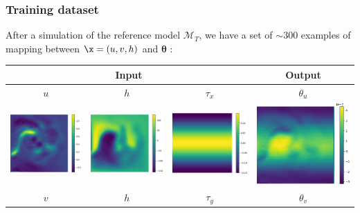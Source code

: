 \documentclass[handout]{beamer}
\newcommand{\btheta}{\mathbf{\theta}}
\newcommand{\M}{\mathcal{M}}
\begin{document}
\begin{frame}
\frametitle{Training dataset}
After a simulation of the reference model 
$\M_T$, we have a set of $\sim 300$ examples of mapping between 
$\x = (u,v,h)$ and $\btheta$ :

\begin{table}
\begin{tabular}{|ccc|c|}
\hline
\multicolumn{3}{|c|}{Input} & Output \\
\hline
$u$ &  $h$ & $\tau_x$ & $\theta_u $ \\
\includegraphics[width=.22\textwidth]{./fig/L3/trainset-u.png} &
\includegraphics[width=.22\textwidth]{./fig/L3/trainset-h.png} &
\includegraphics[width=.22\textwidth]{./fig/L3/trainset-tau.png} &
\includegraphics[width=.22\textwidth]{./fig/L3/trainset-uparam.png}\\
\hline
$v$ &  $h$ & $\tau_y$ & $\theta_v $ \\
\hline
\end{tabular}
\end{table}


\end{frame}
\end{document}

